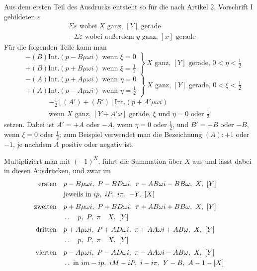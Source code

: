Aus dem ersten Teil des Ausdrucks entsteht so für die nach Artikel $2$, Vorschrift I gebildeten $\varepsilon$
\[
\begin{aligned}
&\Sigma\varepsilon\text{ wobei }X\text{ ganz, }[Y]\text{ gerade}\\
&-\Sigma\varepsilon\text{ wobei außerdem }y\text{ ganz, }[x]\text{ gerade}
\end{aligned}
\]
Für die folgenden Teile kann man
\[
\left.\begin{aligned}
&-(B)\mathrm{Int.}(p-B\mu\omega i)\text{ wenn }\xi=0\\
&+(B)\mathrm{Int.}(p+B\mu\omega i)\text{ wenn }\xi=\tfrac12
\end{aligned}\right\}\ X\text{ ganz, }[Y]\text{ gerade, }0<\eta<\tfrac12
\]
\[
\left.\begin{aligned}
&-(A)\mathrm{Int.}(p+A\mu\omega i)\text{ wenn }\eta=0\\
&+(A)\mathrm{Int.}(p-A\mu\omega i)\text{ wenn }\eta=\tfrac12
\end{aligned}\right\}\ X\text{ ganz, }[Y]\text{ gerade, }0<\xi<\tfrac12
\]
\[
\begin{gathered}
-\tfrac12[(A')+(B')]\mathrm{Int.}(p+A'\mu\omega i)\\
\text{wenn }X\text{ ganz, }[Y+A'\omega]\text{ gerade, }\xi\text{ und }\eta=0\text{ oder }\tfrac12
\end{gathered}
\]
setzen. Dabei ist $A'=+A$ oder $-A$, wenn $\eta=0$ oder $\tfrac12$, und $B'=+B$ oder $-B$, wenn $\xi=0$ oder $\tfrac12$; zum Beispiel verwendet man die Bezeichnung $(A):+1$ oder $-1$, je nachdem $A$ positiv oder negativ ist.

Multipliziert man mit $(-1)^X$, führt die Summation über $X$ aus und lässt dabei in diesen Ausdrücken, und zwar im
\[
\begin{aligned}
\text{ersten}\quad&p-B\mu\omega i,\ P-BD\omega i,\ \pi-AB\omega i-BB\omega,\ X,\ [Y]\\
&\text{jeweils in }ip,\ iP,\ i\pi,\ -Y,\ [X]\\[3pt]
\text{zweiten}\quad&p+B\mu\omega i,\ P+BD\omega i,\ \pi+AB\omega i+BB\omega,\ X,\ [Y]\\
&\mathinner{.\,.}\quad p,\ P,\ \pi\quad X,\ [Y]\\[3pt]
\text{dritten}\quad&p+A\mu\omega i,\ P+AD\omega i,\ \pi+AA\omega i+AB\omega,\ X,\ [Y]\\
&\mathinner{.\,.}\quad p,\ P,\ \pi\quad X,\ [Y]\\[3pt]
\text{vierten}\quad&p-A\mu\omega i,\ P-AD\omega i,\ \pi-AA\omega i-AB\omega,\ X,\ [Y]\\
&\mathinner{.\,.}\text{ in }im-ip,\ iM-iP,\ i-i\pi,\ Y-B,\ A-1-[X]
\end{aligned}
\]

